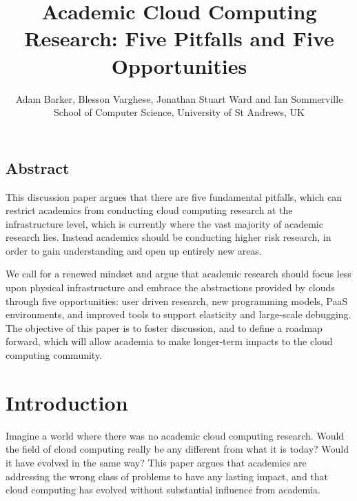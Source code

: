 \documentclass[letterpaper,twocolumn,10pt]{article}
\begin{document}
\date{}

\title{ \bf Academic Cloud Computing Research: Five Pitfalls and Five Opportunities
}
\author{
{\rm Adam Barker, Blesson Varghese, Jonathan Stuart Ward and Ian Sommerville}
\\ School of Computer Science, University of St Andrews, UK
}

\maketitle

\subsection*{Abstract}
This discussion paper argues that there are five fundamental pitfalls, which can restrict academics from conducting cloud computing research at the infrastructure level, which is currently where the vast majority of academic research lies. Instead academics should be conducting higher risk research, in order to gain understanding and open up entirely new areas. 

We call for a renewed mindset and argue that academic research should focus less upon physical infrastructure and embrace the abstractions provided by clouds through five opportunities: user driven research, new programming models, PaaS environments, and improved tools to support elasticity and large-scale debugging. The objective of this paper is to foster discussion, and to define a roadmap forward, which will allow academia to make longer-term impacts to the cloud computing community.

\section{Introduction}

Imagine a world where there was no academic cloud computing research. Would the field of cloud computing really be any different from what it is today? Would it have evolved in the same way? This paper argues that academics are addressing the wrong class of problems to have any lasting impact, and that cloud computing has evolved without substantial influence from academia. 
\end{document}
